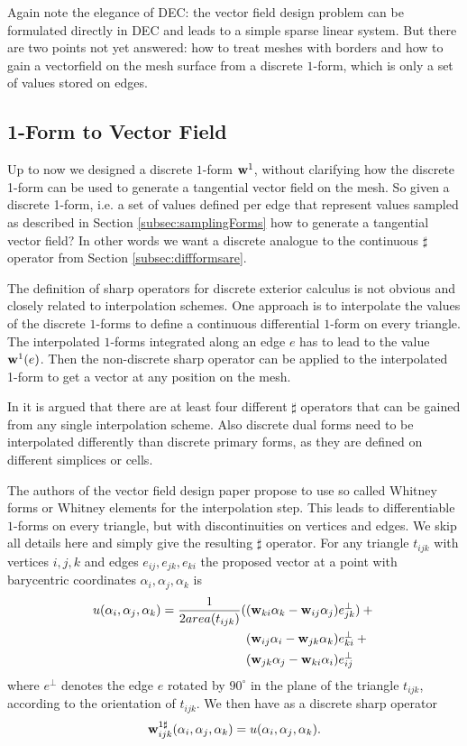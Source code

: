Again note the elegance of DEC: the vector field design problem can be formulated directly in DEC and leads to a simple sparse linear system. But there are two points not yet answered: how to treat meshes with borders and how to gain a vectorfield on the mesh surface from a discrete $1$-form, which is only a set of values stored on edges.

\subsection{1-Form to Vector Field}
\label{sec:vf_1form2vf}
Up to now we designed a discrete $1$-form $\textbf{w}^1$, without clarifying how the discrete 1-form can be used to generate a tangential vector field on the mesh. So given a discrete  1-form, i.e. a set of values defined per edge that represent values sampled as described in Section  \ref{subsec:samplingForms} how to generate a tangential vector field? In other words we want a discrete analogue to the continuous $\sharp$ operator from Section \ref{subsec:diffformsare}.

The definition of sharp operators for discrete exterior calculus is not obvious and closely related to interpolation schemes. One approach is to interpolate the values of the discrete $1$-forms to define a continuous differential $1$-form on every triangle. The interpolated $1$-forms integrated along an edge $e$ has to lead to the value $\textbf{w}^1(e)$. Then the non-discrete sharp operator can be applied to the interpolated 1-form to get a vector at any position on the mesh.

In \cite{hirani03} it is argued that there are at least four different $\sharp$ operators that can be gained from any single interpolation scheme. Also discrete dual forms need to be interpolated differently than discrete primary forms, as they are defined on different simplices or cells. 

The authors of the vector field design paper \cite{vField} propose to use so called Whitney forms or Whitney elements for the interpolation step. This leads to differentiable $1$-forms on every triangle, but with discontinuities on vertices and edges. We skip all details here and simply give the resulting $\sharp$ operator. For any triangle $t_{ijk}$ with vertices $i,j,k$ and edges $e_{ij}, e_{jk},e_{ki}$ the proposed vector at a point with barycentric coordinates $\alpha_i, \alpha_j, \alpha_k$ is
\begin{align} u(\alpha_i, \alpha_j, \alpha_k) = \frac{1}{2area(t_{ijk})} ( &(\textbf{w}_{ki} \alpha_k - \textbf{w}_{ij} \alpha_j)e_{jk}^\perp ) + {}\nonumber\\
&(\textbf{w}_{ij} \alpha_i - \textbf{w}_{jk} \alpha_k)e_{ki}^\perp + {}\nonumber\\ 
&(\textbf{w}_{jk} \alpha_j - \textbf{w}_{ki} \alpha_i)e_{ij}^\perp
\label{eq:vfSharp}
\end{align}
where $e^\perp$ denotes the edge $e$ rotated by $90^\circ$ in the plane of the triangle $t_{ijk}$, according to the orientation of $t_{ijk}$. We then have as a discrete sharp operator
$$\textbf{w}^{1\sharp}_{ijk}(\alpha_i, \alpha_j, \alpha_k) = u(\alpha_i, \alpha_j, \alpha_k).$$

